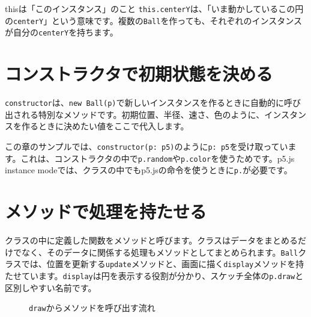 \begin{pointbox}{thisは「このインスタンス」のこと}
\texttt{this.centerY}は、「いま動かしているこの円の\texttt{centerY}」という意味です。複数の\texttt{Ball}を作っても、それぞれのインスタンスが自分の\texttt{centerY}を持ちます。
\end{pointbox}

\section{コンストラクタで初期状態を決める}

\texttt{constructor}は、\texttt{new Ball(p)}で新しいインスタンスを作るときに自動的に呼び出される特別なメソッドです。初期位置、半径、速さ、色のように、インスタンスを作るときに決めたい値をここで代入します。

この章のサンプルでは、\texttt{constructor(p: p5)}のように\texttt{p: p5}を受け取っています。これは、コンストラクタの中で\texttt{p.random}や\texttt{p.color}を使うためです。p5.js instance modeでは、クラスの中でもp5.jsの命令を使うときに\texttt{p.}が必要です。

\section{メソッドで処理を持たせる}

クラスの中に定義した関数をメソッドと呼びます。クラスはデータをまとめるだけでなく、そのデータに関係する処理もメソッドとしてまとめられます。\texttt{Ball}クラスでは、位置を更新する\texttt{update}メソッドと、画面に描く\texttt{display}メソッドを持たせています。\texttt{display}は円を表示する役割が分かり、スケッチ全体の\texttt{p.draw}と区別しやすい名前です。

\begin{figure}[htbp]
    \centering
    \caption{\texttt{draw}からメソッドを呼び出す流れ}
    \label{fig:chapter11-method-calls}
\end{figure}

